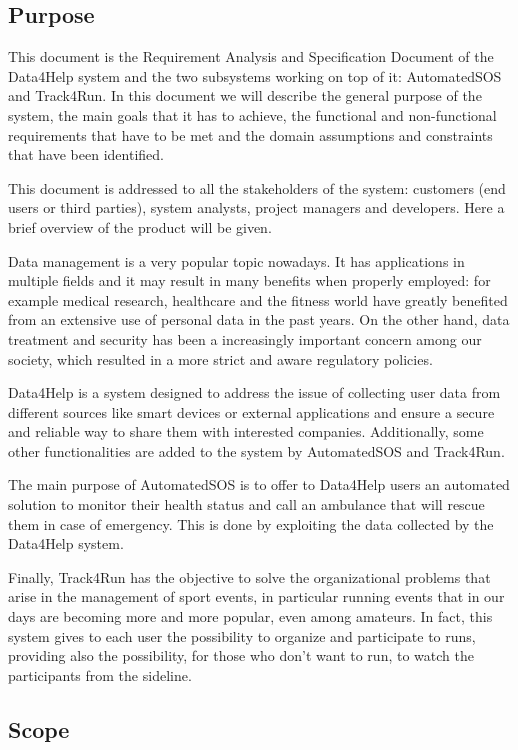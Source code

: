 \subsection{Purpose}
This document is the Requirement Analysis and Specification Document of the Data4Help system and the two subsystems working on top of it: AutomatedSOS and Track4Run. In this document we will describe the general purpose of the system, the main goals that it has to achieve, the functional and non-functional requirements that have to be met and the domain assumptions and constraints that have been identified. 

This document is addressed to all the stakeholders of the system: customers (end users or third parties), system analysts, project managers and developers. Here a brief overview of the product will be given.

Data management is a very popular topic nowadays. It has applications in multiple fields and it may result in many benefits when properly employed: for example medical research, healthcare and the fitness world have greatly benefited from an extensive use of personal data in the past years. On the other hand, data treatment and security has been a increasingly important concern among our society, which resulted in a more strict and aware regulatory policies.

Data4Help is a system designed to address the issue of collecting user data from different sources like smart devices or external applications and ensure a secure and reliable way to share them with interested companies. Additionally, some other functionalities are added to the system by AutomatedSOS and Track4Run. 

The main purpose of AutomatedSOS is to offer to Data4Help users an automated solution to monitor their health status and call an ambulance that will rescue them in case of emergency. This is done by exploiting the data collected by the Data4Help system.  

Finally, Track4Run has the objective to solve the organizational problems that arise in the management of sport events, in particular running events that in our days are becoming more and more popular, even among amateurs. In fact, this system gives to each user the possibility to organize and participate to runs, providing also the possibility, for those who don't want to run, to watch the participants from the sideline.
\subsection{Scope}
